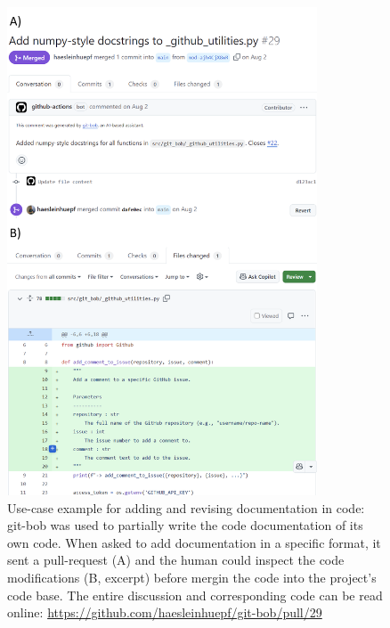 \documentclass[times, twoside]{zHenriquesLab-StyleBioRxiv}
\begin{document}
\begin{figure}[h]
\centering
\includegraphics[width=0.82\textwidth]{example_add_documentation.png}
\caption{Use-case example for adding and revising documentation in code: git-bob was used to partially write the code documentation of its own code. When asked to add documentation in a specific format, it sent a pull-request (A) and the human could inspect the code modifications (B, excerpt) before mergin the code into the project's code base. The entire discussion and corresponding code can be read online: \url{https://github.com/haesleinhuepf/git-bob/pull/29}
\newline
\newline
}
\label{fig:example_add_documentation}
\end{figure}
\end{document}
